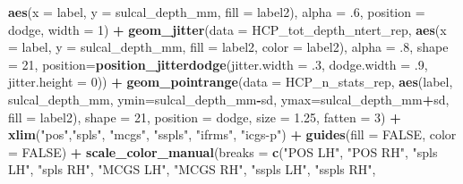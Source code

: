 \documentclass[
]{article}
\newenvironment{Shaded}{\begin{snugshade}}{\end{snugshade}}
\newcommand{\DataTypeTok}[1]{\textcolor[rgb]{0.13,0.29,0.53}{#1}}
\newcommand{\DecValTok}[1]{\textcolor[rgb]{0.00,0.00,0.81}{#1}}
\newcommand{\FloatTok}[1]{\textcolor[rgb]{0.00,0.00,0.81}{#1}}
\newcommand{\KeywordTok}[1]{\textcolor[rgb]{0.13,0.29,0.53}{\textbf{#1}}}
\newcommand{\NormalTok}[1]{#1}
\newcommand{\OperatorTok}[1]{\textcolor[rgb]{0.81,0.36,0.00}{\textbf{#1}}}
\newcommand{\OtherTok}[1]{\textcolor[rgb]{0.56,0.35,0.01}{#1}}
\newcommand{\StringTok}[1]{\textcolor[rgb]{0.31,0.60,0.02}{#1}}
\begin{document}
\begin{Shaded}
\begin{Highlighting}[]
              \KeywordTok{aes}\NormalTok{(}\DataTypeTok{x =}\NormalTok{ label, }\DataTypeTok{y =}\NormalTok{ sulcal_depth_mm, }\DataTypeTok{fill =}\NormalTok{ label2), }
              \DataTypeTok{alpha =} \FloatTok{.6}\NormalTok{, }\DataTypeTok{position =}\NormalTok{ dodge, }\DataTypeTok{width =} \DecValTok{1}\NormalTok{) }\OperatorTok{+}\StringTok{ }
\StringTok{  }\KeywordTok{geom_jitter}\NormalTok{(}\DataTypeTok{data =}\NormalTok{ HCP_tot_depth_ntert_rep, }
              \KeywordTok{aes}\NormalTok{(}\DataTypeTok{x =}\NormalTok{ label, }\DataTypeTok{y =}\NormalTok{ sulcal_depth_mm, }\DataTypeTok{fill =}\NormalTok{ label2, }\DataTypeTok{color =}\NormalTok{ label2), }
              \DataTypeTok{alpha =} \FloatTok{.8}\NormalTok{, }\DataTypeTok{shape =} \DecValTok{21}\NormalTok{,}
              \DataTypeTok{position=}\KeywordTok{position_jitterdodge}\NormalTok{(}\DataTypeTok{jitter.width =} \FloatTok{.3}\NormalTok{, }
                                            \DataTypeTok{dodge.width =} \FloatTok{.9}\NormalTok{, }
                                            \DataTypeTok{jitter.height =} \DecValTok{0}\NormalTok{)) }\OperatorTok{+}
\StringTok{  }\KeywordTok{geom_pointrange}\NormalTok{(}\DataTypeTok{data =}\NormalTok{ HCP_n_stats_rep, }
                  \KeywordTok{aes}\NormalTok{(label, sulcal_depth_mm, }\DataTypeTok{ymin=}\NormalTok{sulcal_depth_mm}\OperatorTok{-}\NormalTok{sd, }\DataTypeTok{ymax=}\NormalTok{sulcal_depth_mm}\OperatorTok{+}\NormalTok{sd, }\DataTypeTok{fill =}\NormalTok{ label2), }
                  \DataTypeTok{shape =} \DecValTok{21}\NormalTok{, }\DataTypeTok{position =}\NormalTok{ dodge, }\DataTypeTok{size =} \FloatTok{1.25}\NormalTok{, }\DataTypeTok{fatten =} \DecValTok{3}\NormalTok{) }\OperatorTok{+}
\StringTok{  }\KeywordTok{xlim}\NormalTok{(}\StringTok{"pos"}\NormalTok{,}\StringTok{"spls"}\NormalTok{, }\StringTok{"mcgs"}\NormalTok{, }\StringTok{"sspls"}\NormalTok{, }\StringTok{"ifrms"}\NormalTok{, }\StringTok{"icgs-p"}\NormalTok{) }\OperatorTok{+}
\StringTok{  }\KeywordTok{guides}\NormalTok{(}\DataTypeTok{fill =} \OtherTok{FALSE}\NormalTok{, }\DataTypeTok{color =} \OtherTok{FALSE}\NormalTok{) }\OperatorTok{+}
\StringTok{  }\KeywordTok{scale_color_manual}\NormalTok{(}\DataTypeTok{breaks =} 
                       \KeywordTok{c}\NormalTok{(}\StringTok{"POS LH"}\NormalTok{, }\StringTok{"POS RH"}\NormalTok{,}
                         \StringTok{"spls LH"}\NormalTok{, }\StringTok{"spls RH"}\NormalTok{,}
                         \StringTok{"MCGS LH"}\NormalTok{, }\StringTok{"MCGS RH"}\NormalTok{,}
                         \StringTok{"sspls LH"}\NormalTok{, }\StringTok{"sspls RH"}\NormalTok{,}

\end{Highlighting}
\end{Shaded}
\end{document}
